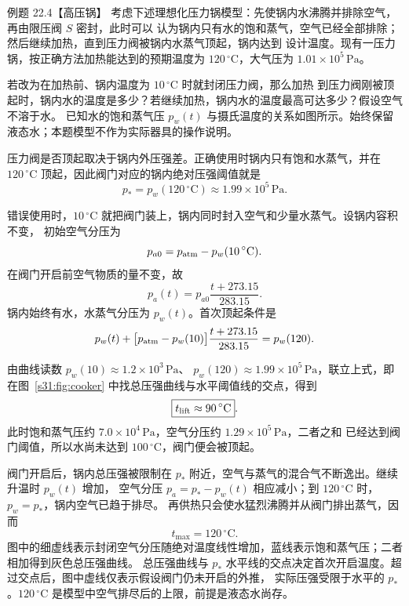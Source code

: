 \begin{origexamplebox}{例题 22.4【高压锅】}
考虑下述理想化压力锅模型：先使锅内水沸腾并排除空气，再由限压阀 $S$ 密封，此时可以
认为锅内只有水的饱和蒸气，空气已经全部排除；然后继续加热，直到压力阀被锅内水蒸气顶起，锅内达到
设计温度。现有一压力锅，按正确方法加热能达到的预期温度为 $120\,{}^{\circ}\mathrm C$，大气压为
$1.01\times10^5\,\mathrm{Pa}$。

若改为在加热前、锅内温度为 $10\,{}^{\circ}\mathrm C$ 时就封闭压力阀，那么加热
到压力阀刚被顶起时，锅内水的温度是多少？若继续加热，锅内水的温度最高可达多少？假设空气不溶于水。
已知水的饱和蒸气压 $p_w(t)$ 与摄氏温度的关系如图所示。始终保留液态水；本题模型不作为实际器具的操作说明。
\pressureCookerQuestionFigure
{}\label{s31:fig:cooker-given}
\end{origexamplebox}

\begin{xesolution}
压力阀是否顶起取决于锅内外压强差。正确使用时锅内只有饱和水蒸气，并在 $120\,{}^{\circ}\mathrm C$
顶起，因此阀门对应的锅内绝对压强阈值就是
\[
  p_*=p_w(120\,{}^{\circ}\mathrm C)\approx1.99\times10^5\,\mathrm{Pa}.
\]

错误使用时，$10\,{}^{\circ}\mathrm C$ 就把阀门装上，锅内同时封入空气和少量水蒸气。设锅内容积不变，
初始空气分压为
\[
  p_{a0}=p_{\rm atm}-p_w(10\,{}^{\circ}\mathrm C).
\]
在阀门开启前空气物质的量不变，故
\[
  p_a(t)=p_{a0}\frac{t+273.15}{283.15}.
\]
锅内始终有水，水蒸气分压为 $p_w(t)$。首次顶起条件是
\[
  p_w(t)+\bigl[p_{\rm atm}-p_w(10)\bigr]
  \frac{t+273.15}{283.15}=p_w(120).
\]

\pressureCookerFigure
{}\label{s31:fig:cooker}

由曲线读数 $p_w(10)\approx1.2\times10^3\,\mathrm{Pa}$、
$p_w(120)\approx1.99\times10^5\,\mathrm{Pa}$，联立上式，即在图~\ref{s31:fig:cooker} 中找总压强曲线与水平阈值线的交点，得到
\[
  \boxed{t_{\rm lift}\approx90\,{}^{\circ}\mathrm C}.
\]
此时饱和蒸气压约 $7.0\times10^4\,\mathrm{Pa}$，空气分压约 $1.29\times10^5\,\mathrm{Pa}$，二者之和
已经达到阀门阈值，所以水尚未达到 $100\,{}^{\circ}\mathrm C$，阀门便会被顶起。

阀门开启后，锅内总压强被限制在 $p_*$ 附近，空气与蒸气的混合气不断逸出。继续升温时 $p_w(t)$ 增加，
空气分压 $p_a=p_*-p_w(t)$ 相应减小；到 $120\,{}^{\circ}\mathrm C$ 时，$p_w=p_*$，锅内空气已趋于排尽。
再供热只会使水猛烈沸腾并从阀门排出蒸气，因而
\[
  \boxed{t_{\max}=120\,{}^{\circ}\mathrm C}.
\]
图中的细虚线表示封闭空气分压随绝对温度线性增加，蓝线表示饱和蒸气压；二者相加得到灰色总压强曲线。
总压强曲线与 $p_*$ 水平线的交点决定首次开启温度。超过交点后，图中虚线仅表示假设阀门仍未开启的外推，
实际压强受限于水平的 $p_*$。$120\,{}^\circ\mathrm C$ 是模型中空气排尽后的上限，前提是液态水尚存。
\end{xesolution}

